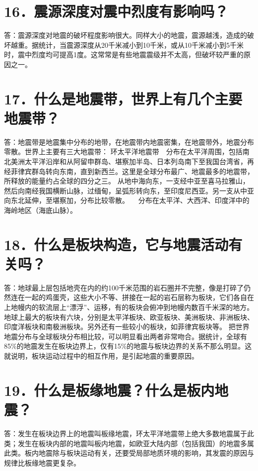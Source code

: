 \documentclass[a4paper,12pt,english]{sphinxmanual}
\begin{document}
\section{16．震源深度对震中烈度有影响吗？}
\label{\detokenize{index:id18}}
答：震源深度对地震的破坏程度影响很大。同样大小的地震，震源越浅，造成的破坏越重。据统计，当震源深度从20千米减小到10千米，或从10千米减小到5千米时，震中烈度均可提高1度。这常常是有些地震震级并不太高，但破坏较严重的原因之一。


\section{17．什么是地震带，世界上有几个主要地震带？}
\label{\detokenize{index:id19}}
答：地震带是地震集中分布的地带，在地震带内地震密集，在地震带外，地震分布零散。世界上主要有三大地震带：
环太平洋地震带　分布在太平洋周围，包括南北美洲太平洋沿岸和从阿留申群岛、堪察加半岛、日本列岛南下至我国台湾省，再经菲律宾群岛转向东南，直到新西兰。这里是全球分布最广、地震最多的地震带，所释放的能量约占全球的四分之三。
   从地中海向东，一支经中亚至喜马拉雅山，然后向南经我国横断山脉，过缅甸，呈弧形转向东，至印度尼西亚。另一支从中亚向东北延伸，至堪察加，分布比较零散。
　分布在太平洋、大西洋、印度洋中的海岭地区（海底山脉）。


\section{18．什么是板块构造，它与地震活动有关吗？}
\label{\detokenize{index:id20}}
答：地球最上层包括地壳在内的约100千米范围的岩石圈并不完整，像是打碎了仍然连在一起的鸡蛋壳，这些大小不等、拼接在一起的岩石层称为板块，它们各自在上地幔内的软流层上“漂浮”、运移，有的板块会俯冲到地幔内数百千米深的地方。
地球上最大的板块有六块，分别是太平洋板块、欧亚板块、美洲板块、非洲板块、印度洋板块和南极洲板块。另外还有一些较小的板块，如菲律宾板块等。
把世界地震分布与全球板块分布相比较，可以明显看出两者非常吻合。据统计，全球有85\%的地震发生在板块边界上，仅有15\%的地震与板块边界的关系不那么明显。这就说明，板块运动过程中的相互作用，是引起地震的重要原因。


\section{19．什么是板缘地震？什么是板内地震？}
\label{\detokenize{index:id21}}
答：发生在板块边界上的地震叫板缘地震，环太平洋地震带上绝大多数地震属于此类；发生在板块内部的地震叫板内地震，如欧亚大陆内部（包括我国）的地震多属此类。板内地震除与板块运动有关，还要受局部地质环境的影响，其发震的原因与规律比板缘地震更复杂。
\end{document}
